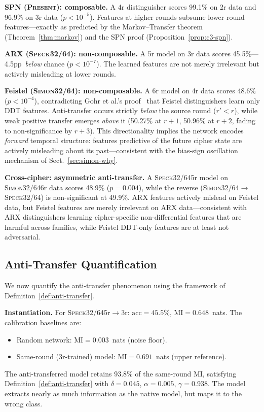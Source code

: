 \documentclass[runningheads]{llncs}
\newcommand{\speck}{\textsc{Speck32/64}}
\newcommand{\simon}{\textsc{Simon32/64}}
\newcommand{\present}{\textsc{Present}}
\newcommand{\pp}{pp}
\begin{document}
\textbf{SPN (\present): composable.}
A 4r distinguisher scores 99.1\% on 2r data and 96.9\% on 3r data ($p < 10^{-5}$).
Features at higher rounds subsume lower-round features---exactly as predicted by the Markov--Transfer theorem (Theorem~\ref{thm:markov}) and the SPN proof (Proposition~\ref{prop:c3-spn}).

\textbf{ARX (\speck): non-composable.}
A 5r model on 3r data scores 45.5\%---4.5\pp\ \emph{below} chance ($p < 10^{-7}$).
The learned features are not merely irrelevant but actively misleading at lower rounds.

\textbf{Feistel (\simon): non-composable.}
A 6r model on 4r data scores 48.6\% ($p < 10^{-4}$), contradicting Gohr et al.'s proof~\cite{gohr2022assessment} that Feistel distinguishers learn only DDT features.
Anti-transfer occurs strictly \emph{below} the source round ($r' < r$), while weak positive transfer emerges \emph{above} it (50.27\% at $r{+}1$, 50.96\% at $r{+}2$, fading to non-significance by $r{+}3$).
This directionality implies the network encodes \emph{forward} temporal structure: features predictive of the future cipher state are actively misleading about its past---consistent with the bias-sign oscillation mechanism of Sect.~\ref{sec:simon-why}.

\textbf{Cross-cipher: asymmetric anti-transfer.}
A \speck 5r model on \simon 6r data scores 48.9\% ($p = 0.004$), while the reverse (\simon$\to$\speck) is non-significant at 49.9\%.
ARX features actively mislead on Feistel data, but Feistel features are merely irrelevant on ARX data---consistent with ARX distinguishers learning cipher-specific non-differential features that are harmful across families, while Feistel DDT-only features are at least not adversarial.


\subsection{Anti-Transfer Quantification}
\label{sec:exp-paradox}

We now quantify the anti-transfer phenomenon using the framework of Definition~\ref{def:anti-transfer}.

\textbf{Instantiation.}
For \speck 5r$\to$3r: $\mathrm{acc} = 45.5\%$, $\mathrm{MI} = 0.648$~nats.
The calibration baselines are:
\begin{itemize}[itemsep=1pt,topsep=2pt]
  \item Random network: $\mathrm{MI} = 0.003$~nats (noise floor).
  \item Same-round (3r-trained) model: $\mathrm{MI} = 0.691$~nats (upper reference).
\end{itemize}
The anti-transferred model retains 93.8\% of the same-round MI, satisfying Definition~\ref{def:anti-transfer} with $\delta = 0.045$, $\alpha = 0.005$, $\gamma = 0.938$.
The model extracts nearly as much information as the native model, but maps it to the wrong class.
\end{document}
